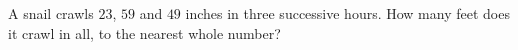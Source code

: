 A snail crawls $23$, $59$ and $49$ inches in three successive hours. How many feet does it crawl in all, to the nearest whole number?
